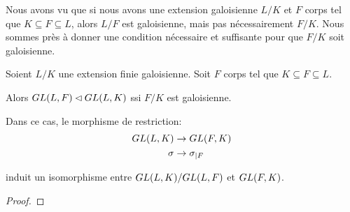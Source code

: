 Nous avons vu que si nous avons une extension galoisienne $L/K$ et $F$ corps tel
que $K \subseteq F \subseteq L$, alors $L/F$ est galoisienne, mais pas
nécessairement $F/K$.
Nous sommes près à donner une condition nécessaire et suffisante pour que $F/K$
soit galoisienne.

\begin{proposition}
	Soient $L/K$ une extension finie galoisienne. Soit $F$ corps tel que $K
	\subseteq F \subseteq L$.

	Alors $GL(L, F) \lhd GL(L, K)$ ssi $F/K$ est
	galoisienne.

	Dans ce cas, le morphisme de restriction:
	\begin{align*}
		GL(L, K) &\rightarrow GL(F, K) \\
		\sigma &\rightarrow \sigma_{|F}
	\end{align*}

	induit un isomorphisme entre $GL(L, K)/GL(L, F)$ et
	$GL(F, K)$.
\end{proposition}

\ifdefined\outputproof
\begin{proof}

\end{proof}
\fi
